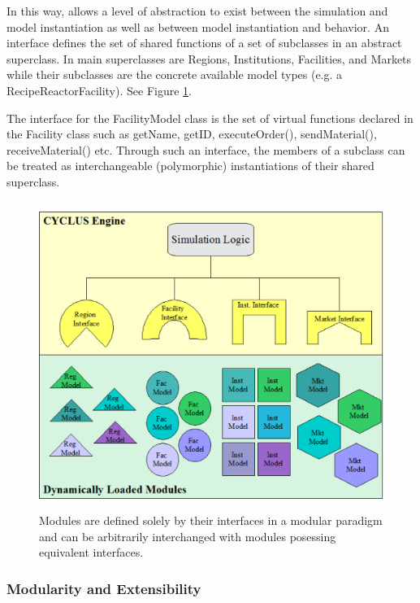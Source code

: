 In this way, \Cyclus allows a level of abstraction to exist between 
the simulation and model instantiation as well as between model 
instantiation and behavior.  An interface defines the set of shared 
functions of a set of subclasses in an abstract superclass. In \Cyclus
main superclasses are Regions, Institutions, Facilities, and Markets 
while their subclasses are the concrete available model types (e.g. a 
RecipeReactorFacility). See Figure \ref{fig:modularity}.

The interface for the FacilityModel class is the set of 
virtual functions declared in the Facility class such as getName, 
getID, executeOrder(), sendMaterial(), receiveMaterial() etc.  Through 
such an interface, the members of a subclass can be treated as 
interchangeable (polymorphic) instantiations of their shared 
superclass. 

\begin{figure}[htbp!]
  \begin{center}
    \includegraphics[height=10cm]{./chapters/paradigm/modularity.png}
  \end{center}
  \caption[Module Interfaces and Encapsulation]{Modules are defined solely 
  by their interfaces in a modular paradigm and can be arbitrarily 
  interchanged with modules posessing equivalent interfaces.}
  \label{fig:modularity}
\end{figure}


\subsubsection{Modularity and Extensibility}


